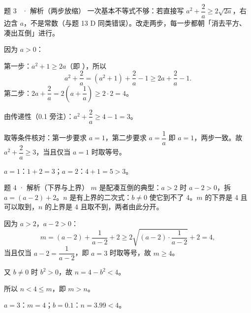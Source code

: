 \begin{solution}{题 3 \starred\ · 解析（两步放缩）}
\think 一次基本不等式不够：若直接写 $a^2+\dfrac2a\ge 2\sqrt{2a}$，右边含 $a$，不是常数（与题 13 D 同类错误）。改走两步，每一步都朝「消去平方、凑出互倒」进行。

\solve 因为 $a>0$：

第一步：$a^2+1\ge 2a$（即 \starref{}），所以
\[
a^2+\frac2a=(a^2+1)+\frac2a-1\ge 2a+\frac2a-1.
\]
第二步：$2a+\dfrac2a=2\left(a+\dfrac1a\right)\ge 2\cdot 2=4$。

由传递性（0.1 旁注）：$a^2+\dfrac2a\ge 4-1=3$。

取等条件核对：第一步要求 $a=1$，第二步要求 $a=\dfrac1a$ 即 $a=1$，两步一致。故 $a^2+\dfrac2a\ge 3$，当且仅当 $a=1$ 时取等号。

\checkup $a=1$：$1+2=3$；$a=2$：$4+1=5>3$。

\end{solution}

\begin{solution}{题 4 · 解析（下界与上界）}
\think $m$ 是配凑互倒的典型：$a>2$ 时 $a-2>0$，拆 $a=(a-2)+2$。$n$ 是有上界的二次式：$b\ne 0$ 使它到不了 4。$m$ 的下界是 4 且可以取到，$n$ 的上界是 4 且取不到，两者由此分开。

\solve 因为 $a>2$，$a-2>0$：
\[
m=(a-2)+\frac{1}{a-2}+2\ge 2\sqrt{(a-2)\cdot\frac{1}{a-2}}+2=4,
\]
当且仅当 $a-2=\dfrac{1}{a-2}$，即 $a=3$ 时取等号，故 $m\ge 4$。

又 $b\ne 0$ 时 $b^2>0$，故 $n=4-b^2<4$。

所以 $n<4\le m$，即 $m>n$。

\checkup $a=3$：$m=4$；$b=0.1$：$n=3.99<4$。

\end{solution}

